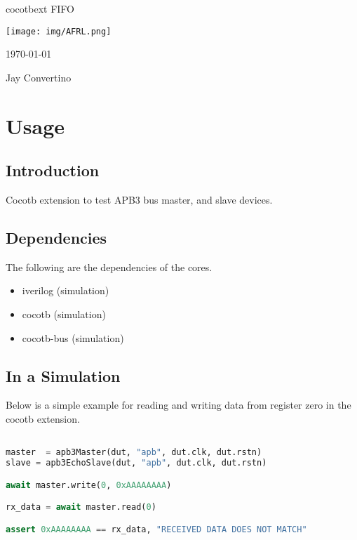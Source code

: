 \begin{titlepage}
  \begin{center}

  {\Huge cocotbext FIFO}

  \vspace{25mm}

  \texttt{[image: img/AFRL.png]}

  \vspace{25mm}

  \today

  \vspace{15mm}

  {\Large Jay Convertino}

  \end{center}
\end{titlepage}

\tableofcontents

\newpage

\section{Usage}

\subsection{Introduction}

\par
Cocotb extension to test APB3 bus master, and slave devices.

\subsection{Dependencies}

\par
The following are the dependencies of the cores.

\begin{itemize}
  \item iverilog (simulation)
  \item cocotb (simulation)
  \item cocotb-bus (simulation)
\end{itemize}

\subsection{In a Simulation}
\par
Below is a simple example for reading and writing data from register zero in the cocotb extension.
\begin{lstlisting}[language=Python]

master  = apb3Master(dut, "apb", dut.clk, dut.rstn)
slave = apb3EchoSlave(dut, "apb", dut.clk, dut.rstn)

await master.write(0, 0xAAAAAAAA)

rx_data = await master.read(0)

assert 0xAAAAAAAA == rx_data, "RECEIVED DATA DOES NOT MATCH"

\end{lstlisting}

